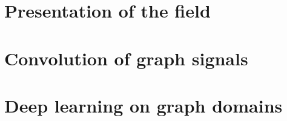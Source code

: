 \documentclass[12pt]{book}
\begin{document}
%
%

\frontmatter
\pagestyle{plain}


%
%

 \dominitoc
 \tableofcontents
 \adjustmtc




% 

%
%

\mainmatter
\pagestyle{headings}


%
%

  \chapter{Presentation of the field}\label{chap:1}
  \minitoc\newpage
  \newpage

  \newpage
  \newpage
  \newpage

%
%

\setcounter{chapter}{1}
\chapter{Convolution of graph signals}\label{chap:2}
  \minitoc\newpage
  \newpage

\newpage
\newpage
\newpage
\newpage
\newpage

%
%
 \setcounter{chapter}{2}
 \chapter{Deep learning on graph domains}\label{chap:3}
  \minitoc\newpage
  \newpage
\end{document}
